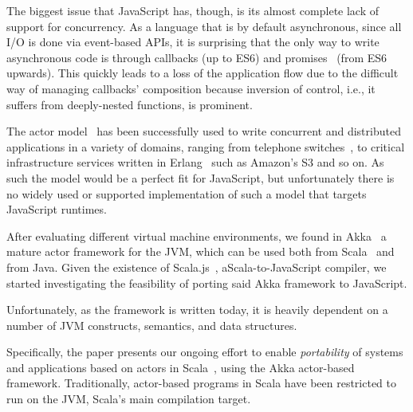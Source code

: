 \documentclass{sig-alternate}
\begin{document}
The biggest issue that JavaScript has, though, is its almost complete lack of support for concurrency. As a language that is by default asynchronous, since all I/O is done via event-based APIs, it is surprising that the only way to write asynchronous code is through callbacks (up to ES6) and promises~\cite{LiskovS88} (from ES6 upwards). This quickly leads to a loss of the application flow due to the difficult way of managing callbacks' composition because inversion of control, i.e., it suffers from deeply-nested functions, is prominent.

The actor model~\cite{Hewitt77,Agha} has been successfully used to write concurrent and distributed applications in a variety of domains, ranging from telephone switches~\cite{ErlangApplications}, to critical infrastructure services written in Erlang~\cite{Armstrong10} such as Amazon's S3 and so on. As such the model would be a perfect fit for JavaScript, but unfortunately there is no widely used or supported implementation of such a model that targets JavaScript runtimes.

After evaluating different virtual machine environments, we found in Akka~\cite{Akka} a mature actor framework for the JVM\cite{Lindholm-Yellin}, which can be used both from Scala~\cite{OderskyR14} and from Java. Given the existence of Scala.js~\cite{Scalajs}, a\newline Scala-to-JavaScript compiler, we started investigating the feasibility of porting said Akka framework to JavaScript.

Unfortunately, as the framework is written today, it is heavily dependent on a number of JVM constructs, semantics, and data structures. %

Specifically, the paper presents our ongoing effort to enable {\em portability} of systems and applications based on actors in Scala~\cite{ActorsInScala}, using the Akka actor-based framework. Traditionally, actor-based programs in Scala have been restricted to run on the JVM, Scala's main compilation target. %
\end{document}
